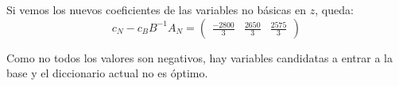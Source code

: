 \documentclass[10pt,a4paper]{article}
\begin{document}
Si vemos los nuevos coeficientes de las variables no básicas en $z$, queda:
\[
	c_N - c_B B^{-1} A_N = \begin{pmatrix}
		\frac{-2800}{3} & \frac{2650}{3} & \frac{2575}{3}
\end{pmatrix}
\]

Como no todos los valores son negativos, hay variables candidatas a entrar a la base y el diccionario actual no es óptimo. %

%
%
%
%
\end{document}
